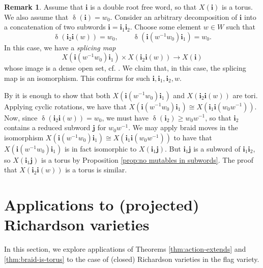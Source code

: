 \documentclass[a4paper, 11pt]{amsart}
\newcommand{\word}[1]{\mathbf{#1}}
\DeclareMathOperator{\dem}{\delta}
\theoremstyle{definition}
\newtheorem{remark}[theorem]{Remark}
\begin{document}
\begin{remark}
    Assume that $\word{i}$ is a double root free word, so that $X(\word{i})$ is a torus. We also assume that $\dem(\word{i}) = w_0$. Consider an arbitrary decomposition of $\word{i}$  into a concatenation of two subwords $\word{i} = \word{i}_1\word{i}_2$. Choose some element $w \in W$ such that
    \[
    \dem(\word{i}_2\word{i}(w)) = w_0, \qquad \dem(\word{i}(w^{-1}w_0)\word{i}_1) = w_0.
    \]
    In this case, we have a \emph{splicing map}
    \[
    X(\word{i}(w^{-1}w_0)\word{i}_1) \times X(\word{i}_2\word{i}(w)) \to X(\word{i})
    \]
    whose image is a dense open set, cf. \cite[Theorem 1.1]{splicing2}. We claim that, in this case, the splicing map is an isomorphism. This confirms \cite[Conjecture 5.6]{splicing2} for such $\word{i}, \word{i}_1, \word{i}_2, w$.
    
    By \cite[Lemma 2.1]{splicing2} it is enough to show that both $X(\word{i}(w^{-1}w_0)\word{i}_1)$ and $X(\word{i}_2\word{i}(w))$ are tori. Applying cyclic rotations, we have that $X(\word{i}(w^{-1}w_0)\word{i}_1) \cong X(\word{i}_1\word{i}(w_0w^{-1}))$. Now, since $\dem(\word{i}_2\word{i}(w)) = w_0$, we must have $\dem(\word{i}_2) \geq w_0w^{-1}$, so that $\word{i}_2$ contains a reduced subword $\word{j}$ for $w_0w^{-1}$. We may apply braid moves in the isomorphism $X(\word{i}(w^{-1}w_0)\word{i}_1) \cong X(\word{i}_1\word{i}(w_0w^{-1}))$ to have that $X(\word{i}(w^{-1}w_0)\word{i}_1)$ is in fact isomorphic to $X(\word{i}_1\word{j})$. But $\word{i}_1\word{j}$ is a subword of $\word{i}_1\word{i}_2$, so $X(\word{i}_1\word{j})$ is a torus by Proposition \ref{prop:no mutables in subwords}. The proof that $X(\word{i}_2\word{i}(w))$ is a torus is similar. 
\end{remark}



\section{Applications to (projected) Richardson varieties}\label{sec:richardsons}

In this section, we explore applications of Theorems \ref{thm:action-extends} and \ref{thm:braid-is-torus} to the case of (closed) Richardson varieties in the flag variety. 
\end{document}
